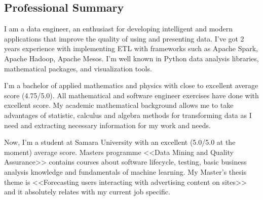 \subsection*{Professional Summary}
    I am a data engineer, an enthusiast for developing intelligent and modern applications that improve the quality
    of using and presenting data. I've got 2 years experience with implementing ETL with frameworks such as
    Apache Spark, Apache Hadoop, Apache Mesos. I'm well known in Python data analysis libraries, mathematical packages,
    and visualization tools.

    I'm a bachelor of applied mathematics and physics with close to excellent average score (4.75/5.0). All mathematical
    and software engineer exercises have done with excellent score. My academic mathematical background allows me to
    take advantages of statistic, calculus and algebra methods for transforming data as I need and extracting necessary
    information for my work and needs.

    Now, I'm a student at Samara University with an excellent (5.0/5.0 at the moment) average score. Masters programme
    <<Data Mining and Quality Assurance>> contains courses about software lifecycle, testing, basic business analysis
    knowledge and fundamentals of machine learning. My Master's thesis theme is <<Forecasting users interacting with
    advertising content on sites>> and it absolutely relates with my current job specific.
